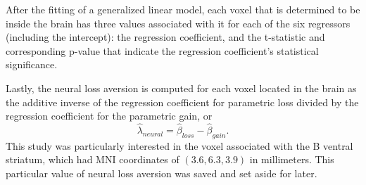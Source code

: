 \par \indent After the fitting of a generalized linear model, each voxel that is
determined to be inside the brain has three values associated with it for each
of the six regressors (including the intercept): the regression coefficient, and
the t-statistic and corresponding p-value that indicate the regression
coefficient's statistical significance.

\par \indent Lastly, the neural loss aversion is computed for each voxel located
in the brain as the additive inverse of the regression coefficient for
parametric loss divided by the regression coefficient for the parametric gain,
or
\[
\hat{ \lambda }_{ neural } = \hat{ \beta }_{ loss } - \hat{ \beta }_{ gain }.
\]
This study was particularly interested in the voxel associated with the B
ventral striatum, which had MNI coordinates of $\left( 3.6 , 6.3 , 3.9 \right)$
in millimeters. This particular value of neural loss aversion was saved and set
aside for later.

